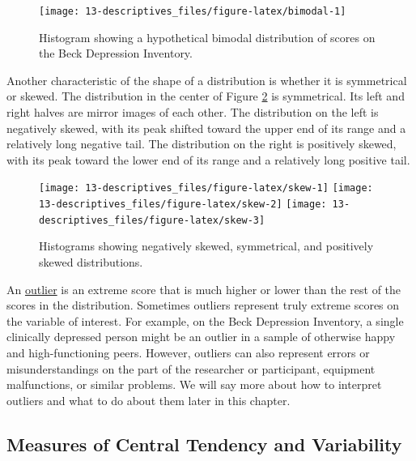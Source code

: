 \documentclass[
]{krantz}
\begin{document}
\begin{figure}

{\centering \texttt{[image: 13-descriptives\_files/figure-latex/bimodal-1]} 

}

\caption{Histogram showing a hypothetical bimodal distribution of scores on the Beck Depression Inventory.}\label{fig:bimodal}
\end{figure}

Another characteristic of the shape of a distribution is whether it is symmetrical or skewed. The distribution in the center of Figure \ref{fig:skew} is symmetrical. Its left and right halves are mirror images of each other. The distribution on the left is negatively skewed, with its peak shifted toward the upper end of its range and a relatively long negative tail. The distribution on the right is positively skewed, with its peak toward the lower end of its range and a relatively long positive tail.

\begin{figure}

{\centering \texttt{[image: 13-descriptives\_files/figure-latex/skew-1]} \texttt{[image: 13-descriptives\_files/figure-latex/skew-2]} \texttt{[image: 13-descriptives\_files/figure-latex/skew-3]} 

}

\caption{Histograms showing negatively skewed, symmetrical, and positively skewed distributions.}\label{fig:skew}
\end{figure}

An \protect\hyperlink{outlier}{outlier} is an extreme score that is much higher or lower than the rest of the scores in the distribution. Sometimes outliers represent truly extreme scores on the variable of interest. For example, on the Beck Depression Inventory, a single clinically depressed person might be an outlier in a sample of otherwise happy and high-functioning peers. However, outliers can also represent errors or misunderstandings on the part of the researcher or participant, equipment malfunctions, or similar problems. We will say more about how to interpret outliers and what to do about them later in this chapter.

\hypertarget{measures-of-central-tendency-and-variability}{%
\subsection*{Measures of Central Tendency and Variability}\label{measures-of-central-tendency-and-variability}}
\end{document}
